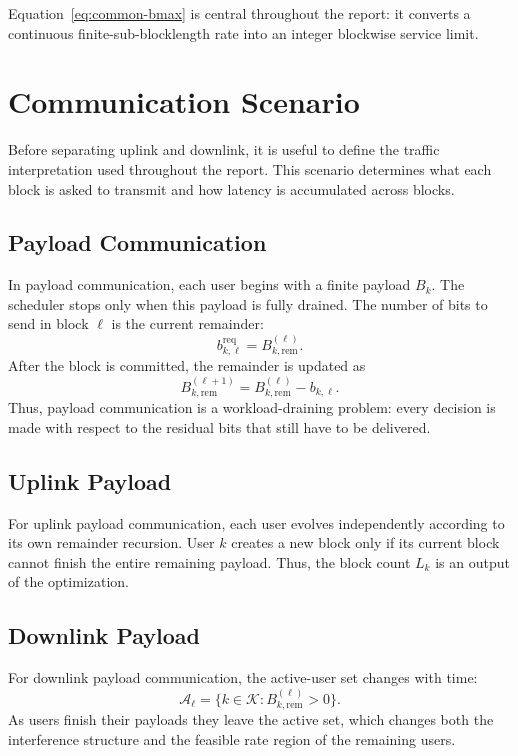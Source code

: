 \documentclass[11pt]{article}
\newcommand{\Kset}{\mathcal{K}}
\newcommand{\Aset}{\mathcal{A}}
\begin{document}
Equation~\eqref{eq:common-bmax} is central throughout the report: it converts a
continuous finite-sub-blocklength rate into an integer blockwise service limit.

\section{Communication Scenario}

Before separating uplink and downlink, it is useful to define the traffic
interpretation used throughout the report. This scenario determines what each
block is asked to transmit and how latency is accumulated across blocks.

\subsection{Payload Communication}

In payload communication, each user begins with a finite payload
$B_k$. The scheduler stops only when this payload is fully
drained. The number of bits to send in block $\ell$ is the current remainder:
\begin{equation}
b_{k,\ell}^{\mathrm{req}}=B_{k,\mathrm{rem}}^{(\ell)}.
\label{eq:payload-request}
\end{equation}
After the block is committed, the remainder is updated as
\begin{equation}
B_{k,\mathrm{rem}}^{(\ell+1)}=B_{k,\mathrm{rem}}^{(\ell)}-b_{k,\ell}.
\label{eq:payload-update}
\end{equation}
Thus, payload communication is a workload-draining problem: every decision is made
with respect to the residual bits that still have to be delivered.

\subsection{Uplink Payload}

For uplink payload communication, each user evolves independently according to its
own remainder recursion. User $k$ creates a new block only if its current block
cannot finish the entire remaining payload. Thus, the block count
$L_k$ is an output of the optimization.

\subsection{Downlink Payload}

For downlink payload communication, the active-user set changes with time:
\begin{equation}
\Aset_\ell = \{k\in\Kset : B_{k,\mathrm{rem}}^{(\ell)}>0\}.
\label{eq:downlink-payload-active}
\end{equation}
As users finish their payloads they leave the active set, which changes both
the interference structure and the feasible rate region of the remaining users.
\end{document}
